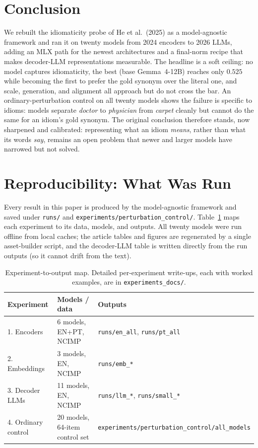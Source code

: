 \documentclass[11pt]{article}
\begin{document}
\section{Conclusion}

We rebuilt the idiomaticity probe of He et al.~(2025) as a model-agnostic framework and ran it on
twenty models from 2024 encoders to 2026 LLMs, adding an MLX path for the newest architectures and a
final-norm recipe that makes decoder-LLM representations measurable. The headline is a soft ceiling:
no model captures idiomaticity, the best (base Gemma~4-12B) reaches only $0.525$ while becoming the
first to prefer the gold synonym over the literal one, and scale, generation, and alignment all
approach but do not cross the bar. An ordinary-perturbation control on all twenty models shows the
failure is specific to idioms: models separate \emph{doctor} to \emph{physician} from \emph{carpet}
cleanly but cannot do the same for an idiom's gold synonym. The original conclusion therefore stands,
now sharpened and calibrated: representing what an idiom \emph{means}, rather than what its words
\emph{say}, remains an open problem that newer and larger models have narrowed but not solved.

\appendix
\section{Reproducibility: What Was Run}
\label{sec:repro}

Every result in this paper is produced by the model-agnostic framework and saved under \texttt{runs/}
and \texttt{experiments/perturbation\_control/}. Table~\ref{tab:repro} maps each experiment to its
data, models, and outputs. All twenty models were run offline from local caches; the article tables
and figures are regenerated by a single asset-builder script, and the decoder-LLM table is written
directly from the run outputs (so it cannot drift from the text).

\begin{table}[H]
\centering
\small
\begin{tabular}{lll}
\toprule
Experiment & Models / data & Outputs \\
\midrule
1. Encoders & 6 models, EN+PT, NCIMP & \texttt{runs/en\_all}, \texttt{runs/pt\_all} \\
2. Embeddings & 3 models, EN, NCIMP & \texttt{runs/emb\_*} \\
3. Decoder LLMs & 11 models, EN, NCIMP & \texttt{runs/llm\_*}, \texttt{runs/small\_*} \\
4. Ordinary control & 20 models, 64-item control set & \texttt{experiments/perturbation\_control/all\_models} \\
\bottomrule
\end{tabular}
\caption{Experiment-to-output map. Detailed per-experiment write-ups, each with worked examples, are
in \texttt{experiments\_docs/}.}
\label{tab:repro}
\end{table}
\end{document}
